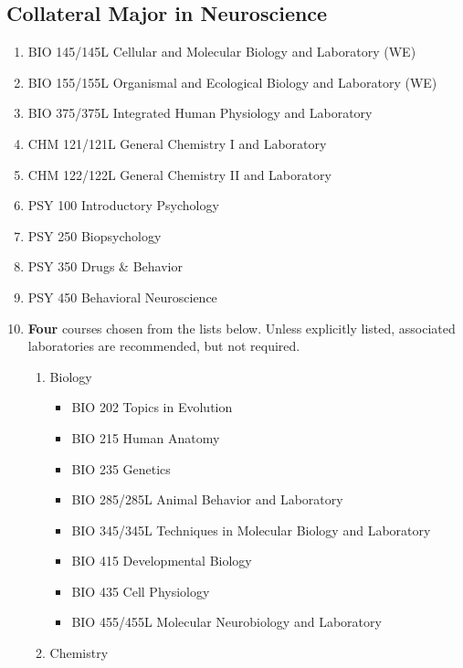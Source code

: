 \documentclass[
  letterpaper,
]{scrbook}
\providecommand{\tightlist}{%
  \setlength{\itemsep}{0pt}\setlength{\parskip}{0pt}}
\begin{document}
\subsection{Collateral Major in
Neuroscience}\label{collateral-major-in-neuroscience}

\begin{enumerate}
\def\labelenumi{\arabic{enumi}.}
\tightlist
\item
  BIO 145/145L Cellular and Molecular Biology and Laboratory (WE)
\item
  BIO 155/155L Organismal and Ecological Biology and Laboratory (WE)
\item
  BIO 375/375L Integrated Human Physiology and Laboratory
\item
  CHM 121/121L General Chemistry I and Laboratory
\item
  CHM 122/122L General Chemistry II and Laboratory
\item
  PSY 100 Introductory Psychology
\item
  PSY 250 Biopsychology
\item
  PSY 350 Drugs \& Behavior
\item
  PSY 450 Behavioral Neuroscience
\item
  \textbf{Four} courses chosen from the lists below. Unless explicitly
  listed, associated laboratories are recommended, but not required.

  \begin{enumerate}
  \def\labelenumii{\alph{enumii}.}
  \tightlist
  \item
    Biology

    \begin{itemize}
    \tightlist
    \item
      BIO 202 Topics in Evolution
    \item
      BIO 215 Human Anatomy
    \item
      BIO 235 Genetics
    \item
      BIO 285/285L Animal Behavior and Laboratory
    \item
      BIO 345/345L Techniques in Molecular Biology and Laboratory
    \item
      BIO 415 Developmental Biology
    \item
      BIO 435 Cell Physiology
    \item
      BIO 455/455L Molecular Neurobiology and Laboratory
    \end{itemize}
  \item
    Chemistry


\end{enumerate}
\end{enumerate}
\end{document}

